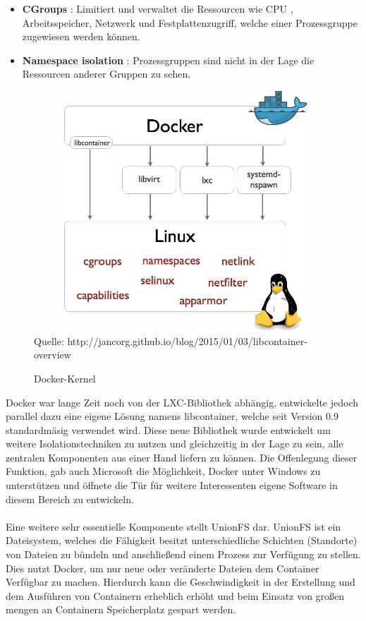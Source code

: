 \documentclass[12pt,toc=bib,toc=listof]{scrreprt}
\begin{document}
\begin{itemize}
	\item \textbf{CGroups} : Limitiert und verwaltet die Ressourcen wie CPU , Arbeitsspeicher, Netzwerk und Festplattenzugriff, welche einer Prozessgruppe zugewiesen werden können. 
	\item \textbf{Namespace isolation} : Prozessgruppen sind nicht in der Lage die Ressourcen anderer Gruppen zu sehen.
\end{itemize}
\begin{figure}
	\centering
	\caption{Docker-Kernel}
	\includegraphics[width=13cm, height=9cm, scale=0.3]{docker-execdriver-diagram.png}\\
	Quelle: http://jancorg.github.io/blog/2015/01/03/libcontainer-overview
\end{figure}
Docker war lange Zeit noch von der LXC-Bibliothek abhängig, entwickelte jedoch parallel dazu eine eigene Lösung namens libcontainer, welche seit Version 0.9 standardmäsig verwendet wird. 
Diese neue Bibliothek wurde entwickelt um weitere Isolationstechniken zu nutzen und gleichzeitig in der Lage zu sein, alle zentralen Komponenten aus einer Hand liefern zu können.
Die Offenlegung dieser Funktion, gab auch Microsoft die Möglichkeit, Docker unter Windows zu unterstützen und öffnete die Tür für weitere Interessenten eigene Software in diesem Bereich zu entwickeln.\\
\\
Eine weitere sehr essentielle Komponente stellt UnionFS dar.
UnionFS ist ein Dateisystem, welches die Fähigkeit besitzt unterschiedliche Schichten (Standorte) von Dateien zu bündeln und anschließend einem Prozess zur Verfügung zu stellen.
Dies nutzt Docker, um nur neue oder veränderte Dateien dem Container Verfügbar zu machen.
Hierdurch kann die Geschwindigkeit in der Erstellung und dem Ausführen von Containern erheblich erhöht und beim Einsatz von großen mengen an Containern Speicherplatz gespart werden.
\end{document}
